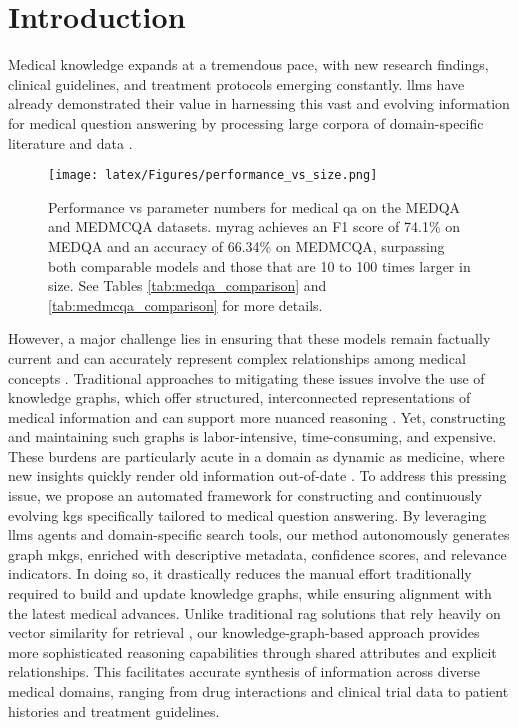 \glsresetall
\section{Introduction}
Medical knowledge expands at a tremendous pace, with new research findings, clinical guidelines, and treatment protocols emerging constantly. \glspl{llm} have already demonstrated their value in harnessing this vast and evolving information for medical question answering by processing large corpora of domain-specific literature and data \cite{nazi2024large,liu2023utility}. 
\begin{figure}[t]
  \centering
  \texttt{[image: latex/Figures/performance\_vs\_size.png]}
  \caption{Performance vs parameter numbers for medical \gls{qa} on the MEDQA and MEDMCQA datasets. \gls{myrag} achieves an F1 score of 74.1\% on MEDQA and an accuracy of 66.34\% on MEDMCQA, surpassing both comparable models and those that are 10 to 100 times larger in size. See Tables \ref{tab:medqa_comparison} and \ref{tab:medmcqa_comparison} for more details.}
  \label{fig:performance_vs_size}
\end{figure}
However, a major challenge lies in ensuring that these models remain factually current and can accurately represent complex relationships among medical concepts \cite{rohanian2024exploring,yu2024large}. Traditional approaches to mitigating these issues involve the use of knowledge graphs, which offer structured, interconnected representations of medical information and can support more nuanced reasoning \cite{huang2021knowledge}. Yet, constructing and maintaining such graphs is labor-intensive, time-consuming, and expensive. These burdens are particularly acute in a domain as dynamic as medicine, where new insights quickly render old information out-of-date \cite{yang2024kg}.
To address this pressing issue, we propose an automated framework for constructing and continuously evolving \glspl{kg} specifically tailored to medical question answering. By leveraging \glspl{llm} agents and domain-specific search tools, our method autonomously generates graph \glspl{mkg}, enriched with descriptive metadata, confidence scores, and relevance indicators. In doing so, it drastically reduces the manual effort traditionally required to build and update knowledge graphs, while ensuring alignment with the latest medical advances. Unlike traditional \gls{rag} solutions that rely heavily on vector similarity for retrieval \cite{lewis2020retrieval}, our knowledge-graph-based approach provides more sophisticated reasoning capabilities through shared attributes and explicit relationships. This facilitates accurate synthesis of information across diverse medical domains, ranging from drug interactions and clinical trial data to patient histories and treatment guidelines.

